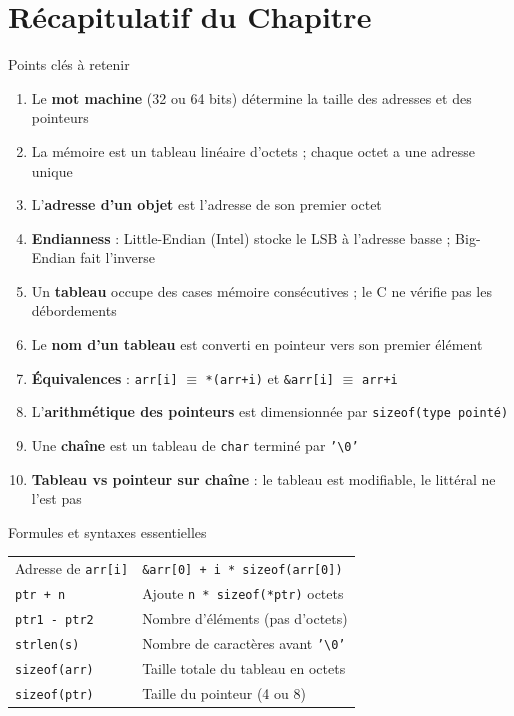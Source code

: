 \documentclass[10pt,a4paper]{article}
\begin{document}
\section{Récapitulatif du Chapitre}

\begin{infobox}{Points clés à retenir}
\begin{enumerate}
    \item Le \textbf{mot machine} (32 ou 64 bits) détermine la taille des adresses et des pointeurs
    \item La mémoire est un tableau linéaire d'octets ; chaque octet a une adresse unique
    \item L'\textbf{adresse d'un objet} est l'adresse de son premier octet
    \item \textbf{Endianness} : Little-Endian (Intel) stocke le LSB à l'adresse basse ; Big-Endian fait l'inverse
    \item Un \textbf{tableau} occupe des cases mémoire consécutives ; le C ne vérifie pas les débordements
    \item Le \textbf{nom d'un tableau} est converti en pointeur vers son premier élément
    \item \textbf{Équivalences} : \texttt{arr[i]} $\equiv$ \texttt{*(arr+i)} et \texttt{\&arr[i]} $\equiv$ \texttt{arr+i}
    \item L'\textbf{arithmétique des pointeurs} est dimensionnée par \texttt{sizeof(type pointé)}
    \item Une \textbf{chaîne} est un tableau de \texttt{char} terminé par \texttt{'\textbackslash0'}
    \item \textbf{Tableau vs pointeur sur chaîne} : le tableau est modifiable, le littéral ne l'est pas
\end{enumerate}
\end{infobox}

\begin{techbox}{Formules et syntaxes essentielles}
\begin{tabular}{ll}
Adresse de \texttt{arr[i]} & \texttt{\&arr[0] + i * sizeof(arr[0])} \\
\texttt{ptr + n} & Ajoute \texttt{n * sizeof(*ptr)} octets \\
\texttt{ptr1 - ptr2} & Nombre d'éléments (pas d'octets) \\
\texttt{strlen(s)} & Nombre de caractères avant \texttt{'\textbackslash0'} \\
\texttt{sizeof(arr)} & Taille totale du tableau en octets \\
\texttt{sizeof(ptr)} & Taille du pointeur (4 ou 8) \\
\end{tabular}
\end{techbox}
\end{document}
